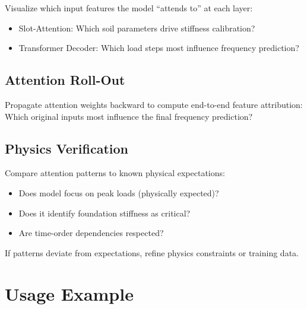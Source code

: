 \documentclass[11pt,a4paper]{article}
\begin{document}
Visualize which input features the model ``attends to'' at each layer:
\begin{itemize}
  \item Slot-Attention: Which soil parameters drive stiffness calibration?
  \item Transformer Decoder: Which load steps most influence frequency prediction?
\end{itemize}

\subsection{Attention Roll-Out}

Propagate attention weights backward to compute end-to-end feature attribution: Which original inputs most influence the final frequency prediction?

\subsection{Physics Verification}

Compare attention patterns to known physical expectations:
\begin{itemize}
  \item Does model focus on peak loads (physically expected)?
  \item Does it identify foundation stiffness as critical?
  \item Are time-order dependencies respected?
\end{itemize}

If patterns deviate from expectations, refine physics constraints or training data.

\section{Usage Example}
\end{document}
